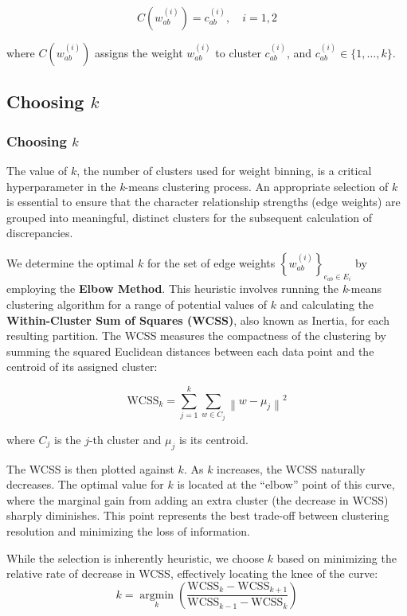 \documentclass[a4paper,12pt]{report}
\begin{document}
\begin{equation}
    C(w_{ab}^{(i)}) = c_{ab}^{(i)}, \quad i = 1, 2
\end{equation}

where \( C(w_{ab}^{(i)}) \) assigns the weight \( w_{ab}^{(i)} \) to cluster \( c_{ab}^{(i)} \), and \( c_{ab}^{(i)} \in \{1, \dots, k\} \).

\subsection{Choosing \( k \)}
\subsubsection{Choosing $k$}
\label{sec:choosing_k}

The value of $k$, the number of clusters used for weight binning, is a critical hyperparameter in the \textsl{k}-means clustering process. An appropriate selection of $k$ is essential to ensure that the character relationship strengths (edge weights) are grouped into meaningful, distinct clusters for the subsequent calculation of discrepancies.

We determine the optimal $k$ for the set of edge weights $\left\{w_{ab}^{(i)}\right\}_{e_{ab} \in E_{i}}$ by employing the \textbf{Elbow Method}. This heuristic involves running the \textsl{k}-means clustering algorithm for a range of potential values of $k$ and calculating the \textbf{Within-Cluster Sum of Squares (WCSS)}, also known as Inertia, for each resulting partition. The WCSS measures the compactness of the clustering by summing the squared Euclidean distances between each data point and the centroid of its assigned cluster:

\begin{equation}
\text{WCSS}_{k} = \sum_{j=1}^{k} \sum_{w \in C_{j}} \left\|w - \mu_{j}\right\|^2
\end{equation}

where $C_{j}$ is the $j$-th cluster and $\mu_{j}$ is its centroid.

The WCSS is then plotted against $k$. As $k$ increases, the WCSS naturally decreases. The optimal value for $k$ is located at the ``elbow'' point of this curve, where the marginal gain from adding an extra cluster (the decrease in WCSS) sharply diminishes. This point represents the best trade-off between clustering resolution and minimizing the loss of information.

While the selection is inherently heuristic, we choose $k$ based on minimizing the relative rate of decrease in WCSS, effectively locating the knee of the curve:
\begin{equation}
k = \underset{k}{\operatorname{argmin}} \left( \frac{\text{WCSS}_{k} - \text{WCSS}_{k+1}}{\text{WCSS}_{k-1} - \text{WCSS}_{k}} \right) 
\end{equation}
\end{document}
